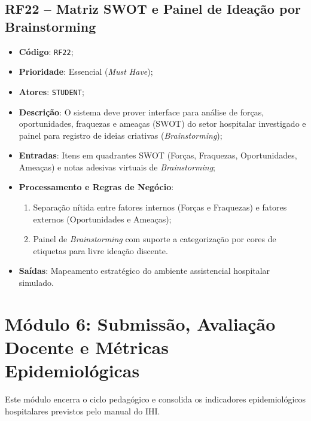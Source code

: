 \subsection{RF22 -- Matriz SWOT e Painel de Ideação por Brainstorming}
\begin{itemize}
    \item \textbf{Código}: \texttt{RF22};
    \item \textbf{Prioridade}: Essencial (\textit{Must Have});
    \item \textbf{Atores}: \texttt{STUDENT};
    \item \textbf{Descrição}: O sistema deve prover interface para análise de forças, oportunidades, fraquezas e ameaças (SWOT) do setor hospitalar investigado e painel para registro de ideias criativas (\textit{Brainstorming});
    \item \textbf{Entradas}: Itens em quadrantes SWOT (Forças, Fraquezas, Oportunidades, Ameaças) e notas adesivas virtuais de \textit{Brainstorming};
    \item \textbf{Processamento e Regras de Negócio}:
    \begin{enumerate}
        \item Separação nítida entre fatores internos (Forças e Fraquezas) e fatores externos (Oportunidades e Ameaças);
        \item Painel de \textit{Brainstorming} com suporte a categorização por cores de etiquetas para livre ideação discente.
    \end{enumerate}
    \item \textbf{Saídas}: Mapeamento estratégico do ambiente assistencial hospitalar simulado.
\end{itemize}

\section{Módulo 6: Submissão, Avaliação Docente e Métricas Epidemiológicas}
\label{sec_mod6_metricas}

Este módulo encerra o ciclo pedagógico e consolida os indicadores epidemiológicos hospitalares previstos pelo manual do IHI.

